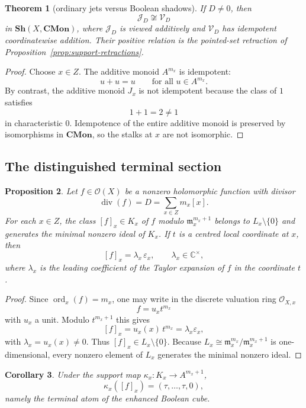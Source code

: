 \documentclass[11pt,a4paper]{article}
\newtheorem{theorem}{Theorem}[section]
\newtheorem{proposition}[theorem]{Proposition}
\newtheorem{corollary}[theorem]{Corollary}
\theoremstyle{definition}
\theoremstyle{remark}
\DeclareMathOperator{\ord}{ord}
\newcommand{\CC}{\mathbb C}
\newcommand{\CMon}{\mathbf{CMon}}
\newcommand{\cO}{\mathcal O}
\newcommand{\taup}{\tau}
\newcommand{\Vd}{\mathcal V_D}
\newcommand{\Jd}{\mathcal J_D}
\newcommand{\epsx}{\varepsilon_x}
\begin{document}
\begin{theorem}[ordinary jets versus Boolean shadows]\label{thm:J-not-V}
If $D\neq0$, then
\[
\Jd\not\cong \Vd
\]
in $\mathbf{Sh}(X,\CMon)$, where $\Jd$ is viewed additively and $\Vd$ has idempotent coordinatewise addition. Their positive relation is the pointed-set retraction of Proposition~\ref{prop:support-retractions}.
\end{theorem}

\begin{proof}
Choose $x\in Z$. The additive monoid $A^{m_x}$ is idempotent:
\[
u+u=u\qquad \text{for all }u\in A^{m_x}.
\]
By contrast, the additive monoid $J_x$ is not idempotent because the class of $1$ satisfies
\[
1+1=2\neq 1
\]
in characteristic $0$. Idempotence of the entire additive monoid is preserved by isomorphisms in $\CMon$, so the stalks at $x$ are not isomorphic.
\end{proof}

\subsection{The distinguished terminal section}

\begin{proposition}\label{prop:local-class-general}
Let $f\in\cO(X)$ be a nonzero holomorphic function with divisor
\[
\operatorname{div}(f)=D=\sum_{x\in Z}m_x[x].
\]
For each $x\in Z$, the class $[f]_x\in K_x$ of $f$ modulo $\mathfrak m_x^{m_x+1}$ belongs to $L_x\setminus\{0\}$ and generates the minimal nonzero ideal of $K_x$. If $t$ is a centred local coordinate at $x$, then
\[
[f]_x=\lambda_x\,\epsx,
\qquad
\lambda_x\in\CC^\times,
\]
where $\lambda_x$ is the leading coefficient of the Taylor expansion of $f$ in the coordinate $t$.
\end{proposition}

\begin{proof}
Since $\ord_x(f)=m_x$, one may write in the discrete valuation ring $\cO_{X,x}$
\[
f=u_x t^{m_x}
\]
with $u_x$ a unit. Modulo $t^{m_x+1}$ this gives
\[
[f]_x=u_x(x)\,t^{m_x}=\lambda_x\epsx,
\]
with $\lambda_x=u_x(x)\neq0$. Thus $[f]_x\in L_x\setminus\{0\}$. Because $L_x\cong \mathfrak m_x^{m_x}/\mathfrak m_x^{m_x+1}$ is one-dimensional, every nonzero element of $L_x$ generates the minimal nonzero ideal.
\end{proof}

\begin{corollary}\label{cor:terminal-atom}
Under the support map $\kappa_x:K_x\to A^{m_x+1}$,
\[
\kappa_x([f]_x)=(\taup,\dots,\taup,0),
\]
namely the terminal atom of the enhanced Boolean cube.
\end{corollary}
\end{document}
